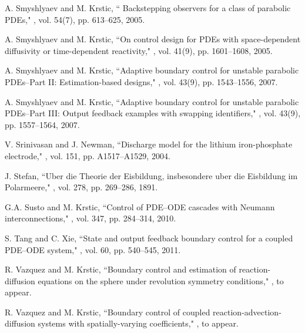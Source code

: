 \documentclass[journal]{IEEEtran}
\begin{document}
\begin{thebibliography}{99}
A. Smyshlyaev and M. Krstic,
\newblock `` Backstepping observers for a class of parabolic PDEs,"
, vol. 54(7), pp. 613--625, 2005.

A. Smyshlyaev and M. Krstic,
\newblock ``On control design for PDEs with space-dependent diffusivity or time-dependent reactivity,"
, vol. 41(9), pp. 1601--1608, 2005.

    
  A. Smyshlyaev and M. Krstic,
 \newblock ``Adaptive boundary control for unstable parabolic PDEs--Part II: Estimation-based designs,"
, vol. 43(9), pp.  1543--1556, 2007.

  
  A. Smyshlyaev and M. Krstic,
 \newblock ``Adaptive boundary control for unstable parabolic PDEs--Part III: Output
feedback examples with swapping identifiers,"
, vol. 43(9), pp.   1557--1564, 2007.

V. Srinivasan and J. Newman,
\newblock ``Discharge model for the lithium iron-phosphate electrode,"
, vol. 151, pp. A1517--A1529, 2004.

J. Stefan,
\newblock ``Uber die Theorie der Eisbildung, insbesondere uber die Eisbildung im Polarmeere,"
, vol. 278, pp. 269--286, 1891.

G.A. Susto and M. Krstic,
\newblock ``Control of {PDE}--{ODE} cascades with Neumann interconnections,"
, vol. 347, pp. 284--314, 2010.

S. Tang and C. Xie,
\newblock ``State and output feedback boundary control for a coupled {PDE}--{ODE} system,"
, vol. 60, pp. 540--545, 2011.

  R. Vazquez and M. Krstic,
    \newblock ``Boundary control and estimation of reaction-diffusion equations on the sphere under revolution symmetry conditions,"
, to appear.
  
  
  R. Vazquez and M. Krstic,
    \newblock ``Boundary control of coupled reaction-advection-diffusion systems with spatially-varying coefficients,"
, to appear.
  


\end{thebibliography}
\end{document}
